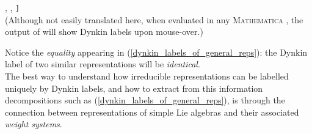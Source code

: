 \documentclass[12pt,a4paper]{article}\let\ifpdf\relax
\begin{document}
{{\hspace{-1.11pt}\mbox{}\hspace{-1.11pt},%
\hspace{-1.11pt}\mbox{}\hspace{-1.11pt},%
\hspace{-1.11pt}\mbox{}\texttt{]}}
}~\\[-2pt]
(Although not easily translated here, when evaluated in any \textsc{Mathematica} , the output of  will show Dynkin labels upon mouse-over.)

Notice the \emph{equality} appearing in (\ref{dynkin_labels_of_general_reps}): the Dynkin label of two similar representations will be \emph{identical}.\\[-10pt]


The best way to understand how irreducible representations can be labelled uniquely by Dynkin labels, and how to extract from this information decompositions such as (\ref{dynkin_labels_of_general_reps}), is through the connection between representations of simple Lie algebras and their associated \emph{weight systems}.
\end{document}

